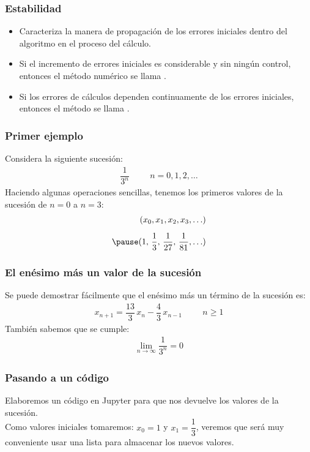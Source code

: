 \documentclass[12pt]{beamer}
\begin{document}
\begin{frame}
\frametitle{Estabilidad}
\begin{itemize}[<+->]
\item[\ding{221}] Caracteriza la manera de propagación de los errores iniciales dentro del algoritmo en el
proceso del cálculo.
\item[\ding{221}] Si el incremento de errores iniciales es considerable y sin ningún control, entonces el
método numérico se llama .
\item[\ding{221}] Si los errores de cálculos dependen continuamente de los errores iniciales, entonces el método se llama .
\end{itemize}
\end{frame}
\begin{frame}
\frametitle{Primer ejemplo}
Considera la siguiente sucesión:
\pause
\begin{align*}
\dfrac{1}{3^{n}} \hspace{1cm} n = 0, 1, 2, \ldots
\end{align*}
\pause
Haciendo algunas operaciones sencillas, tenemos los primeros valores de la sucesión de $n = 0$ a $n = 3$:
\pause
\begin{eqnarray*}
( x_{0}, x_{1}, x_{2}, x_{3}, \ldots ) \\[0.5em] \pause
( 1, \, \dfrac{1}{3}, \, \dfrac{1}{27}, \, \dfrac{1}{81}, \ldots )
\end{eqnarray*}
\end{frame}
\begin{frame}
\frametitle{El enésimo más un valor de la sucesión}
Se puede demostrar fácilmente que el enésimo más un término de la sucesión es:
\pause
\begin{align*}
x_{n+1} = \dfrac{13}{3} \, x_{n} - \dfrac{4}{3} \, x_{n-1} \hspace{1cm} n \geq 1
\end{align*}
\pause
También sabemos que se cumple:
\pause
\begin{align*}
\lim_{n \to \infty} \dfrac{1}{3^{n}} = 0
\end{align*}
\end{frame}
\begin{frame}
\frametitle{Pasando a un código}
Elaboremos un código en Jupyter para que nos devuelve los valores de la sucesión.
\\
\bigskip
\pause
Como valores iniciales tomaremos: $x_{0} = 1$ y $x_{1} = \dfrac{1}{3}$, veremos que será muy conveniente usar una lista para almacenar los nuevos valores.
\end{frame}
\end{document}
